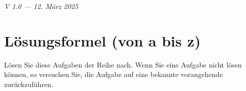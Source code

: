 %


\renewcommand{\bbwAufgabenBlockID}{GlQuad}

\ifisNURAUFGABEN
\newcommand{\LoesungsBlock}[1]{\TRAINER{#1%
\vspace{1mm}
\hrule}}%
\else
\newcommand{\LoesungsBlock}[1]{\noTRAINER{\TNTeop{}}\TRAINER{#1%
\vspace{1mm}
\hrule}}%
\fi

\renewcommand{\metaHeaderLine}{Arbeitsblatt Quadratische Gleichungen}
\renewcommand{\arbeitsblattTitel}{Quadratische Gleichungen: Aufgaben}

\newcommand{\TNTeopS}[1]{\TRAINER{#1}\noTRAINER{\TNTeop{}}}

\arbeitsblattHeader{}

\begin{center}\textit{\tiny{V 1.0 --- 12. März 2025}}\end{center}

\tableofcontents{}

\newpage

\section{Lösungsformel (von a bis z)}
Lösen Sie diese Aufgaben der Reihe nach. Wenn Sie eine Aufgabe nicht lösen können, so versuchen Sie, die Aufgabe auf eine bekannte vorangehende zurückzuführen.



